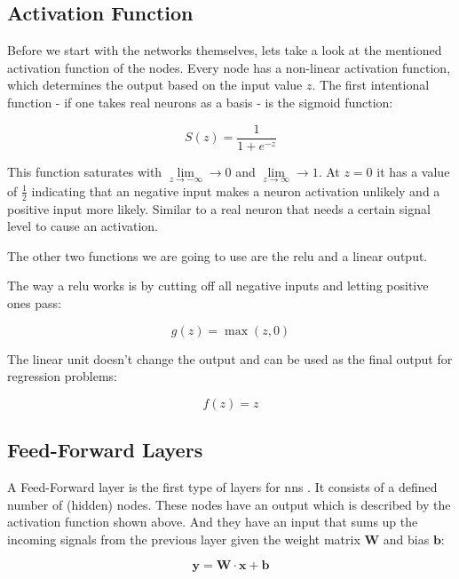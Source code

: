 	\subsection{Activation Function}
	Before we start with the networks themselves, lets take a look at the mentioned activation function of the nodes. \newline
	Every node has a non-linear activation function, which determines the output based on the input value $z$. The first intentional function - if one takes real neurons as a basis - is the sigmoid function:
	
	\begin{equation}
	S(z) = \frac{1}{1 + e^{-z}}
	\end{equation}
	
	This function saturates with $\lim\limits_{z \to -\infty} \rightarrow 0$ and $\lim\limits_{z \to \infty} \rightarrow 1$. At $z=0$ it has a value of $\frac{1}{2}$ indicating that an negative input makes a neuron activation unlikely and a positive input more likely. Similar to a real neuron that needs a certain signal level to cause an activation.
	
	The other two functions we are going to use are the \ac{relu} and a linear output. 
	
	The way a \ac{relu} works is by cutting off all negative inputs and letting positive ones pass:
	
	\begin{equation}
	g(z) = \max(z, 0)
	\end{equation}
	
	The linear unit doesn't change the output and can be used as the final output for regression problems:
	
	\begin{equation}
	f(z) = z
	\end{equation}

	\subsection{Feed-Forward Layers}
	A Feed-Forward layer is the first type of layers for \acp{nn} \cite[p. 163f]{deep-learning}. It consists of a defined number of (hidden) nodes. These nodes have an output which is described by the activation function shown above. And they have an input that sums up the incoming signals from the previous layer given the weight matrix $\mathbf{W}$ and bias $\mathbf{b}$:
	
	\begin{equation}
	\mathbf{y} = \mathbf{W}\cdot \mathbf{x} + \mathbf{b}
	\end{equation}
	
